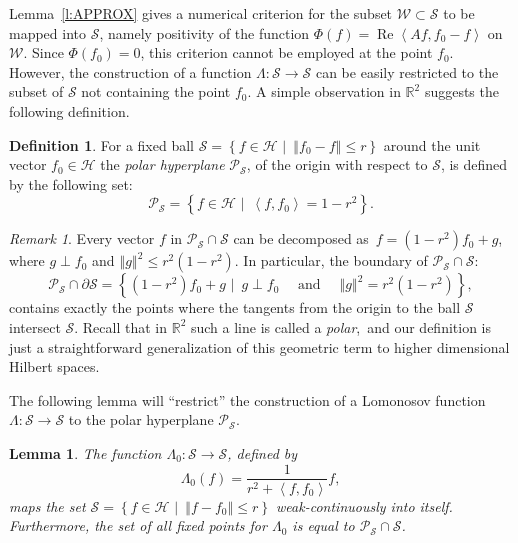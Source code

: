 \documentclass{tran-l}
\newtheorem{lem}[thm]{Lemma}
\theoremstyle{definition}
\newtheorem{defn}[thm]{Definition}
\theoremstyle{remark}
\newtheorem{rem}[thm]{Remark}
\numberwithin{equation}{subsection}
\DeclareMathOperator{\RE}{Re}
\newcommand{\To}{\longrightarrow}
\newcommand{\h}{\mathcal{H}}
\newcommand{\s}{\mathcal{S}}
\newcommand{\W}{\mathcal{W}}
\newcommand{\Real}{\mathbb{R}}
\newcommand{\Polar}{\mathcal{P}_{\s}}
\newcommand{\set}[1]{\left\{#1\right\}}
\newcommand{\seq}[1]{\left<#1\right>}
\newcommand{\norm}[1]{\left\Vert#1\right\Vert}
\begin{document}
Lemma~\ref{l:APPROX} gives a numerical criterion for the subset $\W\subset\s$ to be mapped into $\s$, namely positivity of the function $\Phi(f)=\RE\seq{A{f},f_0-f}$ on $\W$. Since $\Phi(f_0)=0$, this criterion cannot be employed at the point $f_0$. However, the construction of a function $\Lambda\colon\s\To\s$ can be easily restricted to the subset of $\s$ not containing the point $f_0$. A simple observation in $\Real^2$ suggests the following definition.

\begin{defn}
For a fixed ball $\s=\set{f\in\h\,\,|\,\,\, \norm{f_0-f}\leq r}$ around the unit vector $f_0\in\h$ the \emph{polar hyperplane} $\Polar$, of the origin with respect to $\s$, is defined by the following set:
\[ \Polar = \set{f\in\h\,\,|\,\,\, \seq{f,f_0}=1-r^2}. \]
\end{defn}

\begin{rem}
Every vector $f$ in $\Polar\cap\s$ can be decomposed as\, $ f = (1-r^2)f_0 + g$, where $g\perp f_0$ and $\norm{g}^2\leq r^2(1-r^2)$. In particular, the boundary of $\Polar\cap\s$:
\[ \Polar \cap \partial \s = \set{(1-r^2)f_0 + g\,\,\big|\,\,\,
   g\perp f_0 \quad\text{ and }\quad \norm{g}^2=r^2(1-r^2)}, \]
contains exactly the points where the tangents from the origin to the ball $\s$ intersect $\s$. Recall that in $\Real^2$ such a line is called a \emph{polar},\, and our definition is just a straightforward generalization of this geometric term to higher dimensional Hilbert spaces.
\end{rem}

The following lemma will ``restrict'' the construction of a Lomonosov function $\Lambda\colon\s\To\s$ to the polar hyperplane $\Polar$.

\begin{lem} \label{l:SCALE}
The function $\Lambda_0\colon \s \To \s$, defined by
\[ \Lambda_0(f) = \frac{1}{r^2+\seq{f,f_0}} f, \]
maps the set $\s=\set{f\in\h\,\,|\,\,\, \norm{f-f_0}\leq{r}}$ weak-continuously into itself. Furthermore, the set of all fixed points for $\Lambda_0$ is equal to $\Polar\cap\s$.
\end{lem}
\end{document}
